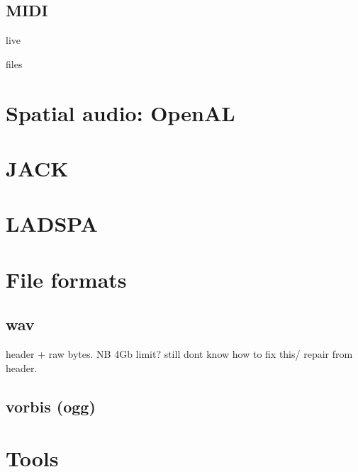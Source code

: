 \documentclass[oneside,english]{scrbook}
\begin{document}
\section{MIDI}

live

files

\chapter{Spatial audio: OpenAL}

\chapter{JACK}


\chapter{LADSPA}


\chapter{File formats}


\section{wav}

header + raw bytes.
NB 4Gb limit? still dont know how to fix this/ repair from header.

\section{vorbis (ogg)}


\chapter{Tools}
\end{document}
